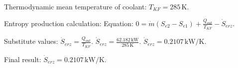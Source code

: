 Thermodynamic mean temperature of coolant:  
\( T_{KF} = 285 \, \text{K} \).  

Entropy production calculation:  
Equation:  
\( 0 = \dot{m} (S_{e2} - S_{e1}) + \frac{Q_{out}}{T_{KF}} - \dot{S}_{erz} \).  

Substitute values:  
\( \dot{S}_{erz} = \frac{Q_{out}}{T_{KF}} \).  
\( \dot{S}_{erz} = \frac{62.182 \, \text{kW}}{285 \, \text{K}} \).  
\( \dot{S}_{erz} = 0.2107 \, \text{kW/K} \).  

Final result:  
\( \dot{S}_{erz} = 0.2107 \, \text{kW/K} \).